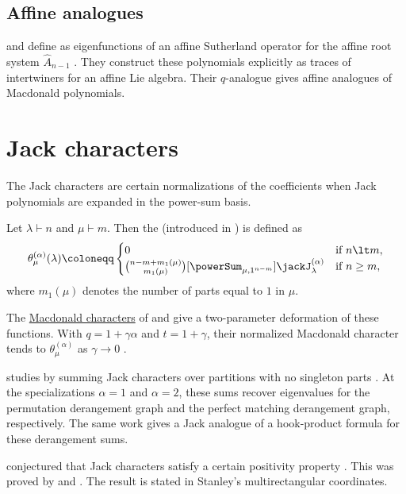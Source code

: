 \subsection[jackAffineAnalogues]{Affine analogues}

 and  define
\label{affineJackPolynomial}
as eigenfunctions of an affine Sutherland
operator for the affine root system $\hat{A}_{n-1}$ \cite{EtingofKirillov1994x}.
They construct these polynomials explicitly as traces of intertwiners for an
affine Lie algebra.  Their $q$-analogue gives affine analogues of Macdonald
polynomials.


\section[jackCharacters]{Jack characters}

The Jack characters are certain normalizations of the coefficients
when Jack polynomials are expanded in the power-sum basis.

Let $\lambda \vdash n$ and $\mu \vdash m$.
Then the \label{jackCharacter} (introduced in
\cite{Lassalle2008,Lassalle2009}) is defined as
\[
 \theta_{\mu}^{(\alpha)}(\lambda) \coloneqq
 \begin{cases}
 0 & \text{if } n\lt m, \\
 \binom{n- m + m_1(\mu)}{m_1(\mu)}
 [\powerSum_{\mu,1^{n-m}}]\jackJ_\lambda^{(\alpha)}
 & \text{if } n\geq m,
  \end{cases}
\]
where $m_1(\mu)$ denotes the number of parts equal to $1$ in $\mu$.

The \hyperref[macdonaldCharacter]{Macdonald characters} of
 and  give a two-parameter
deformation of these functions.  With $q=1+\gamma\alpha$ and $t=1+\gamma$,
their normalized Macdonald character tends to
$\theta_\mu^{(\alpha)}$ as $\gamma\to0$
\cite[Prop.~5.4]{DaliDAdderio2024x}.

 studies
\label{jackDerangement} by summing Jack
characters over partitions with no singleton parts \cite{Lindzey2023x}.  At
the specializations $\alpha=1$ and $\alpha=2$, these sums recover eigenvalues
for the permutation derangement graph and the perfect matching derangement
graph, respectively.  The same work gives a Jack analogue of a hook-product
formula for these derangement sums.


 conjectured that Jack characters satisfy a certain
positivity property \cite{Lassalle2008}.  This was proved by
 and 
\cite{DaliDolega2023x}.
The result is stated in Stanley's multirectangular coordinates.

